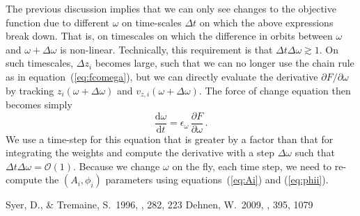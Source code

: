 \documentclass[12pt,preprint]{aastex}
\newcommand{\dd}{\mathrm{d}}
\newcommand{\eqnname}{equation}
\newcommand{\equationname}{\eqnname}
\newcommand{\vzi}{\ensuremath{v_{z,i}}}
\newcommand{\zi}{\ensuremath{z_i}}
\newcommand{\Ai}{\ensuremath{A_i}}
\newcommand{\phii}{\ensuremath{\phi_i}}
\newcommand{\eps}{\ensuremath{\epsilon}}
\begin{document}
The previous discussion implies that we can only see changes to the
objective function due to different $\omega$ on time-scales $\Delta t$
on which the above expressions break down. That is, on timescales on
which the difference in orbits between $\omega$ and $\omega+\Delta
\omega$ is non-linear. Technically, this requirement is that $\Delta t
\Delta \omega \gtrsim 1$. On such timescales, $\Delta \zi$ becomes
large, such that we can no longer use the chain rule as in
\equationname~(\ref{eq:fcomega}), but we can directly evaluate the
derivative $\partial F/\partial \omega$ by tracking $\zi(\omega+\Delta
\omega)$ and $\vzi(\omega+\Delta \omega)$. The force of change equation
then becomes simply
\begin{equation}\label{eq:fcomegaalt}
\frac{\dd \omega}{\dd t} = \eps_\omega \, \frac{\partial F}{\partial \omega}\,.
\end{equation}
We use a time-step for this equation that is greater by a factor than
that for integrating the weights and compute the derivative with a
step $\Delta \omega$ such that $\Delta t \Delta \omega =
\mathcal{O}(1)$. Because we change $\omega$ on the fly, each time
step, we need to re-compute the $(\Ai,\phii)$ parameters using
\equationname s~(\ref{eq:Ai}) and (\ref{eq:phii}).

\begin{thebibliography}{}
 Syer, D., \& Tremaine,
  S.\ 1996, \mnras, 282, 223
  Dehnen, W.\ 2009, \mnras, 395, 1079
\end{thebibliography}
\end{document}
